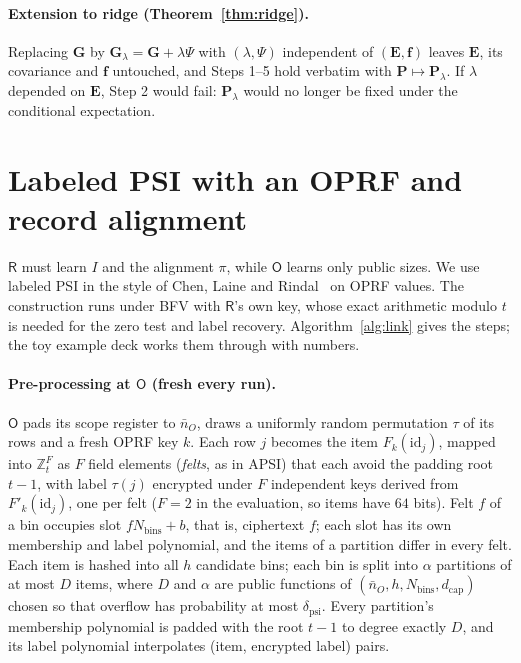 \documentclass[11pt]{article}
\theoremstyle{definition}
\theoremstyle{plain}
\newcommand{\Z}{\mathbb{Z}}
\newcommand{\bG}{\mathbf{G}}
\newcommand{\bP}{\mathbf{P}}
\newcommand{\bE}{\mathbf{E}}
\newcommand{\bff}{\mathbf{f}}
\newcommand{\Party}[1]{\textsf{#1}}
\newcommand{\Rp}{\Party{R}}
\newcommand{\Op}{\Party{O}}
\begin{document}
\paragraph{Extension to ridge (Theorem~\ref{thm:ridge}).}
Replacing $\bG$ by $\bG_{\lambda} = \bG + \lambda\Psi$ with $(\lambda, \Psi)$ independent of $(\bE, \bff)$ leaves $\bE$, its covariance and $\bff$ untouched, and Steps 1--5 hold verbatim with $\bP \mapsto \bP_{\lambda}$. If $\lambda$ depended on $\bE$, Step 2 would fail: $\bP_{\lambda}$ would no longer be fixed under the conditional expectation.

\section{Labeled PSI with an OPRF and record alignment}
\label{app:psi}

$\Rp$ must learn $I$ and the alignment $\pi$, while $\Op$ learns only public sizes. We use labeled PSI in the style of Chen, Laine and Rindal~\cite{chen2017fast,chen2018labeled,cong2021labeled} on OPRF values. The construction runs under BFV with $\Rp$'s own key, whose exact arithmetic modulo $t$ is needed for the zero test and label recovery. Algorithm~\ref{alg:link} gives the steps; the toy example deck works them through with numbers.

\paragraph{Pre-processing at $\Op$ (fresh every run).} $\Op$ pads its scope register to $\bar n_O$, draws a uniformly random permutation $\tau$ of its rows and a fresh OPRF key $k$. Each row $j$ becomes the item $F_k(\mathrm{id}_j)$, mapped into $\Z_t^F$ as $F$ field elements (\emph{felts}, as in APSI) that each avoid the padding root $t - 1$, with label $\tau(j)$ encrypted under $F$ independent keys derived from $F'_k(\mathrm{id}_j)$, one per felt ($F = 2$ in the evaluation, so items have $64$ bits). Felt $f$ of a bin occupies slot $f N_{\mathrm{bins}} + b$, that is, ciphertext $f$; each slot has its own membership and label polynomial, and the items of a partition differ in every felt. Each item is hashed into all $h$ candidate bins; each bin is split into $\alpha$ partitions of at most $D$ items, where $D$ and $\alpha$ are public functions of $(\bar n_O, h, N_{\mathrm{bins}}, d_{\mathrm{cap}})$ chosen so that overflow has probability at most $\delta_{\mathrm{psi}}$. Every partition's membership polynomial is padded with the root $t - 1$ to degree exactly $D$, and its label polynomial interpolates (item, encrypted label) pairs.
\end{document}
